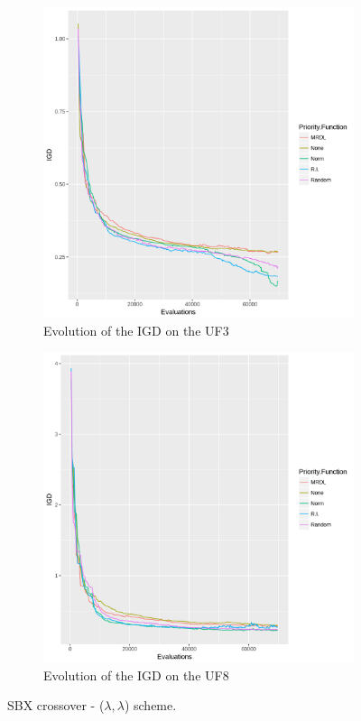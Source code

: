 \begin{figure}[!t]

		\begin{subfigure}[b]{0.49\textwidth}
			\centering
		\includegraphics[width=1\textwidth, height=0.7\textwidth]{images/UF3igd_all}
			\caption{Evolution of the IGD on the UF3}
		\end{subfigure}
		\begin{subfigure}[b]{0.49\textwidth}
			\centering
		\includegraphics[width=1\textwidth, height=0.7\textwidth]{images/UF8igd_all}
			\caption{Evolution of the IGD on the UF8}
		\end{subfigure}
		\caption{SBX crossover - ($\lambda, \lambda$) scheme.}
			\label{evolution_igd}
	\end{figure}


